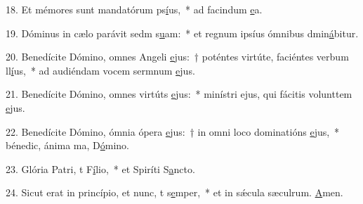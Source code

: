 18. Et mémores sunt mandatórum ps\uline{í}us,~* ad facindum \uline{e}a.\par 
19. Dóminus in cælo parávit sedm s\uline{u}am:~* et regnum ipsíus ómnibus dmin\uline{á}bitur.\par 
20. Benedícite Dómino, omnes Angeli \uline{e}jus:~† poténtes virtúte, faciéntes verbum ll\uline{í}us,~* ad audiéndam vocem sermnum \uline{e}jus.\par 
21. Benedícite Dómino, omnes virtúts \uline{e}jus:~* minístri ejus, qui fácitis volunttem \uline{e}jus.\par 
22. Benedícite Dómino, ómnia ópera \uline{e}jus:~† in omni loco dominatións \uline{e}jus,~* bénedic, ánima ma, D\uline{ó}mino.\par 
23. Glória Patri, t F\uline{í}lio,~* et Spiríti S\uline{a}ncto.\par 
24. Sicut erat in princípio, et nunc, t s\uline{e}mper,~* et in sǽcula sæculrum. \uline{A}men.\par 
